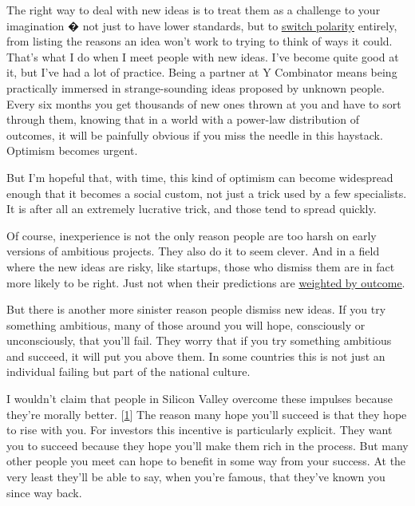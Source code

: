 The right way to deal with new ideas is to
                  treat them as a challenge to your imagination � not just to
                  have lower standards, but to
                  \href{http://www.paulgraham.com/altair.html}{\underline{switch polarity}} entirely,
                  from listing the reasons an idea won't work to trying to think
                  of ways it could. That's what I do when I meet people with new
                  ideas. I've become quite good at it, but I've had a lot of
                  practice. Being a partner at Y Combinator means being
                  practically immersed in strange-sounding ideas proposed by
                  unknown people. Every six months you get thousands of new ones
                  thrown at you and have to sort through them, knowing that in a
                  world with a power-law distribution of outcomes, it will be
                  painfully obvious if you miss the needle in this haystack.
                  Optimism becomes urgent.

But I'm hopeful that, with
                  time, this kind of optimism can become widespread enough that
                  it becomes a social custom, not just a trick used by a few
                  specialists. It is after all an extremely lucrative trick, and
                  those tend to spread quickly.

Of course,
                  inexperience is not the only reason people are too harsh on
                  early versions of ambitious projects. They also do it to seem
                  clever. And in a field where the new ideas are risky, like
                  startups, those who dismiss them are in fact more likely to be
                  right. Just not when their predictions are
                  \href{http://www.paulgraham.com/swan.html}{\underline{weighted by outcome}}.

But there is another more sinister reason people
                  dismiss new ideas. If you try something ambitious, many of
                  those around you will hope, consciously or unconsciously, that
                  you'll fail. They worry that if you try something ambitious
                  and succeed, it will put you above them. In some countries
                  this is not just an individual failing but part of the
                  national culture.

I wouldn't claim that people in
                  Silicon Valley overcome these impulses because they're morally
                  better.
                  [\href{\#f1n}{1}]
                  The reason many hope you'll succeed is that they hope to rise
                  with you. For investors this incentive is particularly
                  explicit. They want you to succeed because they hope you'll
                  make them rich in the process. But many other people you meet
                  can hope to benefit in some way from your success. At the very
                  least they'll be able to say, when you're famous, that they've
                  known you since way back.

